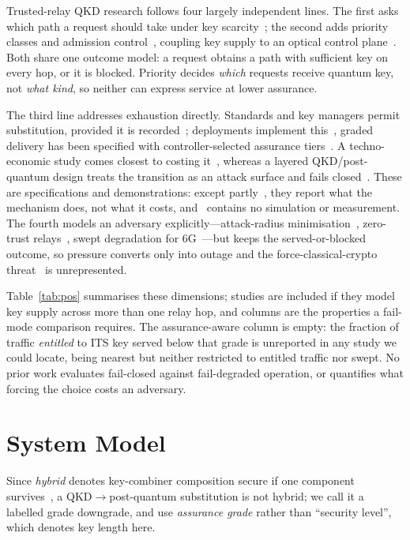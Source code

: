 \documentclass[conference]{IEEEtran}
\begin{document}
Trusted-relay QKD research follows four largely independent lines. The first asks
which path a request should take under key scarcity~\cite{vanduijn,johann,hao,cvitic};
the second adds priority classes and admission control~\cite{mehic}, coupling key
supply to an optical control plane~\cite{cao}. Both share one outcome model: a request obtains a path with
sufficient key on every hop, or it is blocked. Priority decides \emph{which}
requests receive quantum key, not \emph{what kind}, so neither can express service
at lower assurance.

The third line addresses exhaustion directly. Standards and key managers permit
substitution, provided it is recorded~\cite{itu3803,tysowski}; deployments
implement this~\cite{makris}, graded delivery has been specified with
controller-selected assurance tiers~\cite{sanz}. A
techno-economic study comes closest to costing it~\cite{zhu}, whereas a layered
QKD/post-quantum design treats the transition as an attack surface and fails
closed~\cite{spooren}. These are specifications and demonstrations: except
partly~\cite{zhu}, they report what the mechanism does, not what it costs,
and~\cite{tysowski} contains no simulation or measurement. The fourth models an
adversary explicitly---attack-radius minimisation~\cite{li}, zero-trust
relays~\cite{ghorab}, swept degradation for 6G~\cite{hafeez}---but keeps the
served-or-blocked outcome, so pressure converts only into outage and the
force-classical-crypto threat~\cite{schartner} is unrepresented.

Table~\ref{tab:pos} summarises these dimensions; studies are included if they model
key supply across more than one relay hop, and columns are the properties a
fail-mode comparison requires. The assurance-aware column is empty: the fraction of
traffic \emph{entitled} to ITS key served below that grade is unreported in any
study we could locate, \cite{zhu} being nearest but neither restricted to entitled
traffic nor swept. No prior work evaluates fail-closed against fail-degraded
operation, or quantifies what forcing the choice costs an adversary.

\section{System Model}
Since \emph{hybrid} denotes key-combiner composition secure if one component
survives~\cite{ietfhybrid}, a QKD$\rightarrow$post-quantum substitution is not
hybrid; we call it a labelled grade downgrade, and use \emph{assurance grade} rather
than ``security level'', which denotes key length here.
\end{document}
